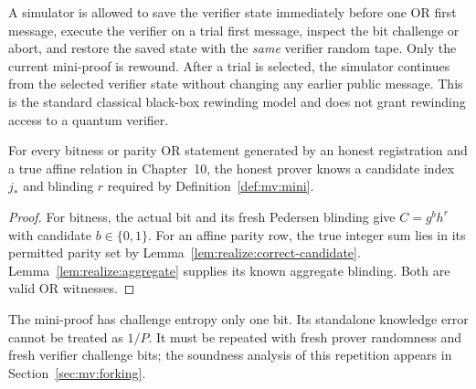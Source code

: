 \begin{definition}\label{def:mv:rewind}
A simulator is allowed to save the verifier state
immediately before one OR first message, execute
the verifier on a trial first message, inspect the
bit challenge or abort, and restore the saved state
with the \emph{same} verifier random tape.
Only the current mini-proof is rewound.
After a trial is selected, the simulator continues
from the selected verifier state without changing
any earlier public message.
This is the standard classical black-box
rewinding model and does not grant rewinding
access to a quantum verifier.
\end{definition}

\begin{lemma}\label{lem:mv:honest-witness}
For every bitness or parity OR statement generated
by an honest registration and a true affine relation
in Chapter~10, the honest prover knows a candidate
index $j_*$ and blinding $r$ required by
Definition~\ref{def:mv:mini}.
\end{lemma}
\begin{proof}
For bitness, the actual bit and its fresh Pedersen
blinding give $C=g^b h^r$ with candidate $b\in\{0,1\}$.
For an affine parity row, the true integer sum lies
in its permitted parity set by
Lemma~\ref{lem:realize:correct-candidate}.
Lemma~\ref{lem:realize:aggregate} supplies its known
aggregate blinding. Both are valid OR witnesses.
\end{proof}

\begin{remark}
The mini-proof has challenge entropy only one bit.
Its standalone knowledge error cannot be treated as
$1/P$. It must be repeated with fresh prover randomness
and fresh verifier challenge bits; the soundness analysis
of this repetition appears in
Section~\ref{sec:mv:forking}.
\end{remark}

